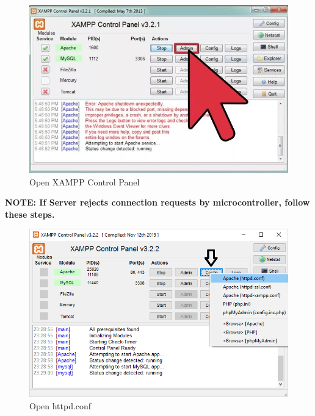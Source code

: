 \documentclass[a4paper,12pt,oneside]{book}
\begin{document}
\begin{enumerate}
\begin{enumerate}
\begin{figure}[H]
							\includegraphics[width=13cm]{xampp3.png}
							\caption{Open XAMPP Control Panel}
						\end{figure}
						\hspace{10px}
						
						\textbf{NOTE: If Server rejects connection requests by microcontroller, follow these steps.}
						
						\begin{figure}[H]  \centering
							\includegraphics[width=13cm]{httpconf2.png}
							\caption{Open httpd.conf}
						\end{figure}
						

\end{enumerate}
\end{enumerate}
\end{document}
